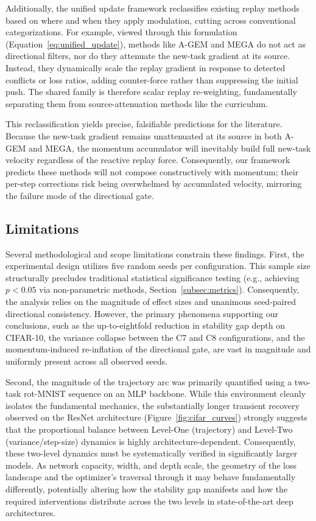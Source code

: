 Additionally, the unified update framework reclassifies existing replay methods based on where and when they apply modulation, cutting across conventional categorizations. For example, viewed through this formulation (Equation~\ref{eq:unified_update}), methods like A-GEM \citep{chaudhry2019efficientlifelonglearningagem} and MEGA \citep{guo2020improvedschemesepisodicmemorybased} do not act as directional filters, nor do they attenuate the new-task gradient at its source. Instead, they dynamically scale the replay gradient in response to detected conflicts or loss ratios, adding counter-force rather than suppressing the initial push. The shared family is therefore scalar replay re-weighting, fundamentally separating them from source-attenuation methods like the curriculum.

This reclassification yields precise, falsifiable predictions for the literature. Because the new-task gradient remains unattenuated at its source in both A-GEM and MEGA, the momentum accumulator will inevitably build full new-task velocity regardless of the reactive replay force. Consequently, our framework predicts these methods will not compose constructively with momentum; their per-step corrections risk being overwhelmed by accumulated velocity, mirroring the failure mode of the directional gate.

\subsection{Limitations}
\label{subsec:disc_limits}

Several methodological and scope limitations constrain these findings. First, the experimental design utilizes five random seeds per configuration. This sample size structurally precludes traditional statistical significance testing (e.g., achieving $p < 0.05$ via non-parametric methods, Section~\ref{subsec:metrics}). Consequently, the analysis relies on the magnitude of effect sizes and unanimous seed-paired directional consistency. However, the primary phenomena supporting our conclusions, such as the up-to-eightfold reduction in stability gap depth on CIFAR-10, the variance collapse between the C7 and C8 configurations, and the momentum-induced re-inflation of the directional gate, are vast in magnitude and uniformly present across all observed seeds.

Second, the magnitude of the trajectory arc was primarily quantified using a two-task rot-MNIST sequence on an MLP backbone. While this environment cleanly isolates the fundamental mechanics, the substantially longer transient recovery observed on the ResNet architecture (Figure~\ref{fig:cifar_curves}) strongly suggests that the proportional balance between Level-One (trajectory) and Level-Two (variance/step-size) dynamics is highly architecture-dependent. Consequently, these two-level dynamics must be systematically verified in significantly larger models. As network capacity, width, and depth scale, the geometry of the loss landscape and the optimizer's traversal through it may behave fundamentally differently, potentially altering how the stability gap manifests and how the required interventions distribute across the two levels in state-of-the-art deep architectures.

